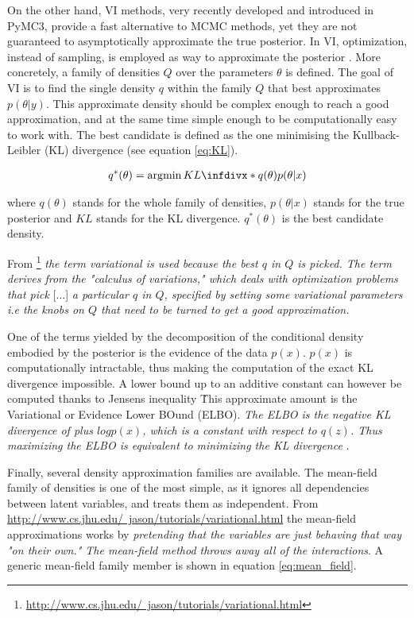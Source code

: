 On the other hand, \ac{VI} methods, very recently developed and introduced in PyMC3, provide a fast alternative to \ac{MCMC} methods, yet they are not guaranteed to asymptotically approximate the true posterior. In \ac{VI}, optimization, instead of sampling, is employed as way to approximate the posterior \cite{Blei2017}. More concretely, a family of densities $Q$ over the parameters $\theta$ is defined. The goal of \ac{VI} is to find the single density $q$ within the family $Q$ that best approximates $p(\theta|y)$. This approximate density should be complex enough to reach a good approximation, and at the same time simple enough to be computationally easy to work with. The best candidate is defined as the one minimising the Kullback-Leibler (\ac{KL}) divergence (see equation \ref{eq:KL}).

\begin{gather}\label{eq:KL}
q^*(\theta) = \argmin \infdiv*{q(\theta)}{p(\theta|x)}
\end{gather}

where $q(\theta)$ stands for the whole family of densities, $p(\theta|x)$ stands for the true posterior and $KL$ stands for the \ac{KL} divergence. $q^*(\theta)$ is the best candidate density.

From \footnote{\href{http://www.cs.jhu.edu/~jason/tutorials/variational.html}{http://www.cs.jhu.edu/~jason/tutorials/variational.html}} \textit{the term variational is used because the best $q$ in $Q$ is picked. The term derives from the "calculus of variations," which deals with optimization problems that pick} [...] \textit{a particular $q$ in $Q$, specified by setting some variational parameters i.e the knobs on $Q$ that need to be turned to get a good approximation.}


One of the terms yielded by the decomposition of the conditional density embodied by the posterior is the evidence of the data $p(x)$.  $p(x)$ is computationally intractable, thus making the computation of the exact \ac{KL} divergence impossible. A lower bound up to an additive constant can however be computed thanks to Jensen\textquotesingle s inequality \cite{jensen1906fonctions} \. This approximate amount is the Variational or Evidence Lower BOund (\ac{ELBO}). \textit{The \ac{ELBO} is the negative \ac{KL} divergence of plus $logp(x)$, which is a constant with respect to $q(z)$. Thus maximizing
the \ac{ELBO} is equivalent to minimizing the \ac{KL} divergence} \cite{Blei2017}.

Finally, several density approximation families are available. The mean-field family of densities is one of the most simple, as it ignores all dependencies between latent variables, and treats them as independent. From \href{http://www.cs.jhu.edu/~jason/tutorials/variational.html}{http://www.cs.jhu.edu/~jason/tutorials/variational.html} the mean-field approximations works by \textit{pretending that the variables are just behaving that way "on their own." The mean-field method throws away all of the interactions}. A generic mean-field family member is shown in equation \ref{eq:mean_field}.

